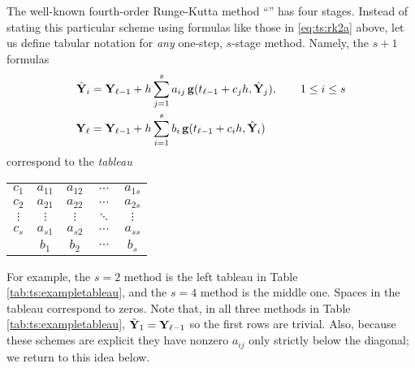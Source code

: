 The well-known fourth-order Runge-Kutta method ``\RKfour'' has four stages.  Instead of stating this particular scheme using formulas like those in \eqref{eq:ts:rk2a} above, let us define tabular notation for \emph{any} one-step, $s$-stage method.  Namely, the $s+1$ formulas
\begin{align}
\hat{\mathbf{Y}}_i &= \mathbf{Y}_{\ell-1} + h \sum_{j=1}^s a_{ij}\, \mathbf{g}(t_{\ell-1} + c_j h, \hat{\mathbf{Y}}_j), \qquad 1 \le i \le s \label{eq:ts:rkgeneral} \\
\mathbf{Y}_\ell  &= \mathbf{Y}_{\ell-1} + h \sum_{i=1}^s b_i\, \mathbf{g}(t_{\ell-1} + c_i h, \hat{\mathbf{Y}}_i) \notag
\end{align}
correspond to the \emph{tableau} \citep{Butcher2008}
\begin{center}
\begin{tabular}{c|cccc}
$c_1$    & $a_{11}$ & $a_{12}$ & $\cdots$ & $a_{1s}$ \\
$c_2$    & $a_{21}$ & $a_{22}$ & $\cdots$ & $a_{2s}$ \\
$\vdots$ & $\vdots$ & $\vdots$ & $\ddots$ & $\vdots$ \\
$c_s$    & $a_{s1}$ & $a_{s2}$ & $\cdots$ & $a_{ss}$ \\ \hline
         & $b_1$    & $b_2$    & $\cdots$ & $b_s$
\end{tabular}
\end{center}

For example, the $s=2$ method \RKtwoa is the left tableau in Table \ref{tab:ts:exampletableau}, and the $s=4$ method \RKfour is the middle one.  Spaces in the tableau correspond to zeros.  Note that, in all three methods in Table \ref{tab:ts:exampletableau}, $\hat{\mathbf{Y}}_1=\mathbf{Y}_{\ell-1}$ so the first rows are trivial.  Also, because these schemes are explicit they have nonzero $a_{ij}$ only strictly below the diagonal; we return to this idea below.


